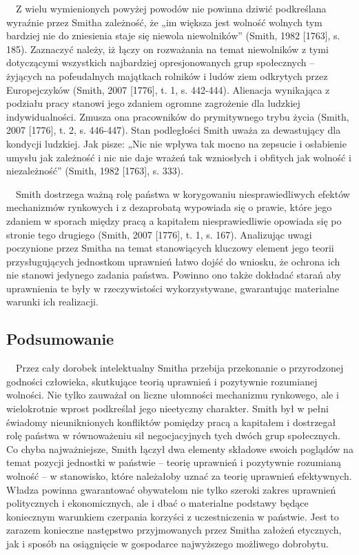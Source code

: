 \documentclass[a4paper]{article}
\begin{document}
\ \ Z wielu wymienionych powyżej powodów nie powinna dziwić podkreślana wyraźnie przez Smitha zależność, że „im większa jest wolność wolnych tym bardziej nie do zniesienia staje się niewola niewolników” \label{ref:RNDtOthMxkQwu}(Smith, 1982 [1763], s. 185). Zaznaczyć należy, iż łączy on rozważania na temat niewolników z tymi dotyczącymi wszystkich najbardziej opresjonowanych grup społecznych – żyjących na pofeudalnych majątkach rolników i ludów ziem odkrytych przez Europejczyków \label{ref:RND3sDYK8lMK4}(Smith, 2007 [1776], t. 1, s. 442-444). Alienacja wynikająca z podziału pracy stanowi jego zdaniem ogromne zagrożenie dla ludzkiej indywidualności. Zmusza ona pracowników do prymitywnego trybu życia \label{ref:RNDARpT9oVdt9}(Smith, 2007 [1776], t. 2, s. 446-447). Stan podległości Smith uważa za dewastujący dla kondycji ludzkiej. Jak pisze: „Nic nie wpływa tak mocno na zepsucie i osłabienie umysłu jak zależność i nic nie daje wrażeń tak wzniosłych i obfitych jak wolność i niezależność” \label{ref:RNDzgsq8IO3HU}(Smith, 1982 [1763], s. 333). 

 \ \ Smith dostrzega ważną rolę państwa w korygowaniu niesprawiedliwych efektów mechanizmów rynkowych i z dezaprobatą wypowiada się o prawie, które jego zdaniem w sporach między pracą a kapitałem niesprawiedliwie opowiada się po stronie tego drugiego \label{ref:RNDISiSQpgteG}(Smith, 2007 [1776], t. 1, s. 167). Analizując uwagi poczynione przez Smitha na temat stanowiących kluczowy element jego teorii przysługujących jednostkom uprawnień łatwo dojść do wniosku, że ochrona ich nie stanowi jedynego zadania państwa. Powinno ono także dokładać starań aby uprawnienia te były w rzeczywistości wykorzystywane, gwarantując materialne warunki ich realizacji.

\subsection{Podsumowanie}
 \ \ Przez cały dorobek intelektualny Smitha przebija przekonanie o przyrodzonej godności człowieka, skutkujące teorią uprawnień i pozytywnie rozumianej wolności. Nie tylko zauważał on liczne ułomności mechanizmu rynkowego, ale i wielokrotnie wprost podkreślał jego nieetyczny charakter. Smith był w pełni świadomy nieuniknionych konfliktów pomiędzy pracą a kapitałem i dostrzegał rolę państwa w równoważeniu sił negocjacyjnych tych dwóch grup społecznych. Co chyba najważniejsze, Smith łączył dwa elementy składowe swoich poglądów na temat pozycji jednostki w państwie – teorię uprawnień i pozytywnie rozumianą wolność – w stanowisko, które należałoby uznać za teorię uprawnień efektywnych. Władza powinna gwarantować obywatelom nie tylko szeroki zakres uprawnień politycznych i ekonomicznych, ale i dbać o materialne podstawy będące koniecznym warunkiem czerpania korzyści z uczestniczenia w państwie. Jest to zarazem konieczne następstwo przyjmowanych przez Smitha założeń etycznych, jak i sposób na osiągnięcie w gospodarce najwyższego możliwego dobrobytu.
\end{document}
